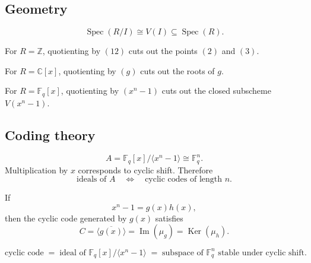 \documentclass[11pt]{article}
\theoremstyle{definition}
\newcommand{\Z}{\mathbb{Z}}
\newcommand{\C}{\mathbb{C}}
\newcommand{\F}{\mathbb{F}}
\newcommand{\Spec}{\operatorname{Spec}}
\newcommand{\im}{\operatorname{Im}}
\newcommand{\Ker}{\operatorname{Ker}}
\newcommand{\ideal}[1]{\langle #1\rangle}
\newcommand{\ol}[1]{\overline{#1}}
\begin{document}
	\subsection*{Geometry}
	
	\[
	\Spec(R/I)\cong V(I)\subseteq \Spec(R).
	\]
	
	For $R=\Z$, quotienting by $(12)$ cuts out the points $(2)$ and $(3)$.
	
	For $R=\C[x]$, quotienting by $(g)$ cuts out the roots of $g$.
	
	For $R=\F_q[x]$, quotienting by $(x^n-1)$ cuts out the closed subscheme $V(x^n-1)$.
	
	\subsection*{Coding theory}
	
	\[
	A=\F_q[x]/\ideal{x^n-1}\cong \F_q^n.
	\]
	Multiplication by $x$ corresponds to cyclic shift. Therefore
	\[
	\text{ideals of }A
	\quad\Longleftrightarrow\quad
	\text{cyclic codes of length }n.
	\]
	
	If
	\[
	x^n-1=g(x)h(x),
	\]
	then the cyclic code generated by $g(x)$ satisfies
	\[
	C=\ideal{\ol{g(x)}}=\im(\mu_g)=\Ker(\mu_h).
	\]
	
	\begin{center}
		\[
		\boxed{
			\text{cyclic code}
			\;=\;
			\text{ideal of }\F_q[x]/\ideal{x^n-1}
			\;=\;
			\text{subspace of }\F_q^n\text{ stable under cyclic shift}.
		}
		\]
	\end{center}
	
\end{document}
